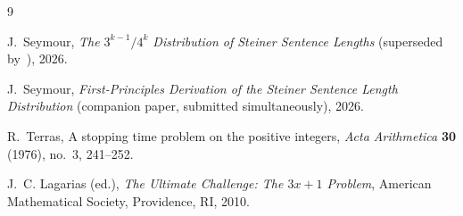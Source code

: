 \documentclass[12pt]{article}
\theoremstyle{definition}
\theoremstyle{remark}
\begin{document}
\begin{thebibliography}{9}

J.~Seymour,
\emph{The $3^{k-1}/4^k$ Distribution of Steiner Sentence Lengths}
(superseded by~\cite{paper67}),
2026.

J.~Seymour,
\emph{First-Principles Derivation of the Steiner Sentence Length Distribution}
(companion paper, submitted simultaneously),
2026.

R.~Terras,
A stopping time problem on the positive integers,
\emph{Acta Arithmetica} \textbf{30} (1976), no.~3, 241--252.

J.~C. Lagarias (ed.),
\emph{The Ultimate Challenge: The $3x+1$ Problem},
American Mathematical Society, Providence, RI, 2010.

\end{thebibliography}
\end{document}
